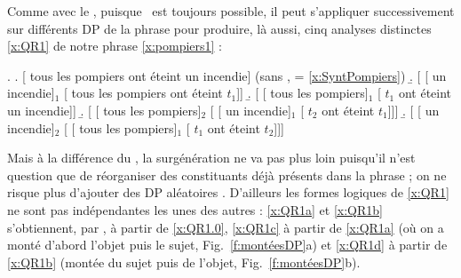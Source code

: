 Comme avec le , puisque \QRa\ est toujours possible, il peut s'appliquer successivement sur différents DP de la phrase pour produire, là aussi, cinq analyses distinctes \ref{x:QR1} de notre phrase \ref{x:pompiers1} :


\ex. \label{x:QR1}
\a.
{}[ tous les pompiers ont éteint un incendie] \label{x:QR1.0}
\hfill{\small(sans {\QRa}, = \ref{x:SyntPompiers})}
\b. 
{}[ [ un incendie]$_1$ [ tous les pompiers ont éteint $t_1$]] \label{x:QR1a}
\b.
{}[ [ tous les pompiers]$_1$ [ $t_1$ ont éteint un incendie]] \label{x:QR1b}
\b.
{}[ [ tous les pompiers]$_2$ [ [ un incendie]$_1$ [ $t_2$ ont éteint $t_1$]]] \label{x:QR1c}
\b.
{}[ [ un incendie]$_2$ [ [ tous les pompiers]$_1$ [ $t_1$ ont éteint $t_2$]]] \label{x:QR1d}


Mais à la différence du , la surgénération ne va pas plus loin puisqu'il n'est question que de réorganiser des constituants déjà présents dans la phrase ; on ne risque plus d'ajouter des DP aléatoires .
D'ailleurs les formes logiques de \ref{x:QR1} ne sont pas indépendantes les unes des autres : \ref{x:QR1a} et \ref{x:QR1b} s'obtiennent, par \QRa, à partir de \ref{x:QR1.0}, \ref{x:QR1c} à partir de \ref{x:QR1a} (où on a monté d'abord l'objet puis le sujet, Fig.~\ref{f:montéesDP}a)  et \ref{x:QR1d} à partir de \ref{x:QR1b} (montée du sujet puis de l'objet, Fig.~\ref{f:montéesDP}b).





